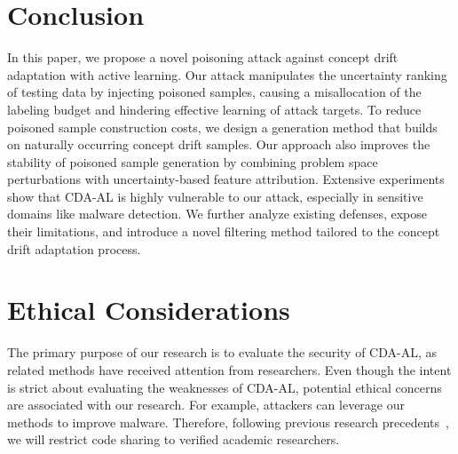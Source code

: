 \documentclass[conference,compsoc]{IEEEtran} %
\providecommand{\DIFaddbegin}{} %
\newcommand{\DIFaddincludegraphics}[2][]{{\color{blue}\fbox{\DIFOincludegraphics[#1]{#2}}}} %
\DeclareRobustCommand{\DIFaddbegin}{\DIFOaddbegin \let\includegraphics\DIFaddincludegraphics} %
\begin{document}
		\section{Conclusion}
In this paper, we propose a novel poisoning attack against concept drift adaptation with active learning.
Our attack manipulates the uncertainty ranking of testing data by injecting poisoned samples, causing a misallocation of the labeling budget and hindering effective learning of attack targets.
To reduce poisoned sample construction costs, we design a generation method that builds on naturally occurring concept drift samples.
Our approach also improves the stability of poisoned sample generation by combining problem space perturbations with uncertainty-based feature attribution.
Extensive experiments show that CDA-AL is highly vulnerable to our attack, especially in sensitive domains like malware detection.
We further analyze existing defenses, expose their limitations, and introduce a novel filtering method tailored to the concept drift adaptation process.

\section*{Ethical Considerations}
\label{Sec: Potential Ethical Concerns}
The primary purpose of our research is to evaluate the security of CDA-AL, as related methods have received attention from researchers. 
Even though the intent is strict about evaluating the weaknesses of CDA-AL, potential ethical concerns are associated with our research. 
For example, attackers can leverage our methods to improve malware. 
Therefore, following previous research precedents~\cite{2020-SP-Kerckhos-principle,2021-CCS-Evasion-Attack-Graph-Attack,2023-CCS-Query-Based-Evasion-Attack}, we will restrict code sharing to verified academic researchers.

		\DIFaddbegin 



\end{document}
